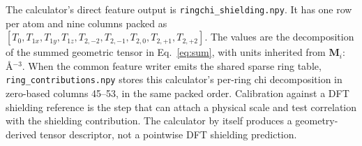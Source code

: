 \documentclass[11pt]{article}
\begin{document}
The calculator's direct feature output is \texttt{ringchi\_shielding.npy}. It
has one row per atom and nine columns packed as
\([T_0,T_{1x},T_{1y},T_{1z},T_{2,-2},T_{2,-1},T_{2,0},T_{2,+1},T_{2,+2}]\).
The values are the decomposition of the summed geometric tensor in
Eq.~\eqref{eq:sum}, with units inherited from \(\bm M_i\):
\(\si{\angstrom^{-3}}\). When the common feature writer emits the shared sparse
ring table, \texttt{ring\_contributions.npy} stores this calculator's per-ring
chi decomposition in zero-based columns 45--53, in the same packed order.
Calibration against a DFT shielding reference is the step that can attach a
physical scale and test correlation with the shielding contribution. The
calculator by itself produces a geometry-derived tensor descriptor, not a
pointwise DFT shielding prediction.
\end{document}
